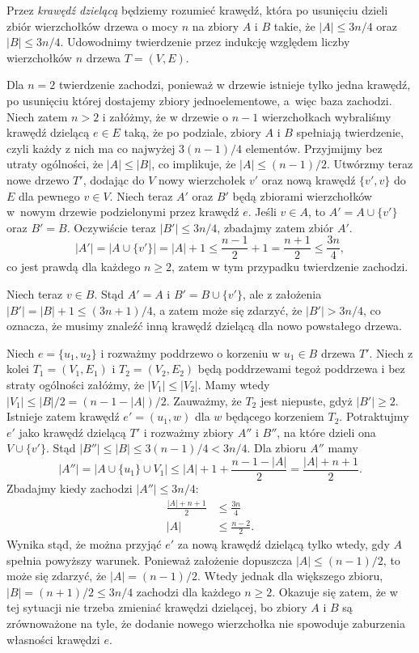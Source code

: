 
\subexercise{} %
Przez \emph{krawędź dzielącą} będziemy rozumieć krawędź, która po usunięciu dzieli zbiór wierzchołków drzewa o mocy $n$ na zbiory $A$ i $B$ takie, że $|A|\le3n/4$ oraz $|B|\le3n/4$. Udowodnimy twierdzenie przez indukcję względem liczby wierzchołków $n$ drzewa $T=(V,E)$.

Dla $n=2$ twierdzenie zachodzi, ponieważ w drzewie istnieje tylko jedna krawędź, po usunięciu której dostajemy zbiory jednoelementowe, a~więc baza zachodzi. Niech zatem $n>2$ i załóżmy, że w drzewie o $n-1$ wierzchołkach wybraliśmy krawędź dzielącą $e\in E$ taką, że po podziale, zbiory $A$ i $B$ spełniają twierdzenie, czyli każdy z nich ma co najwyżej $3(n-1)/4$ elementów. Przyjmijmy bez utraty ogólności, że $|A|\le|B|$, co implikuje, że $|A|\le(n-1)/2$. Utwórzmy teraz nowe drzewo $T'$, dodając do $V$ nowy wierzchołek $v'$ oraz nową krawędź $\{v',v\}$ do $E$ dla pewnego $v\in V$. Niech teraz $A'$ oraz $B'$ będą zbiorami wierzchołków w~nowym drzewie podzielonymi przez krawędź $e$. Jeśli $v\in A$, to $A'=A\cup\{v'\}$ oraz $B'=B$. Oczywiście teraz $|B'|\le3n/4$, zbadajmy zatem zbiór $A'$.
\[
	|A'| = \bigl|A\cup\{v'\}\bigr| = |A|+1 \le \frac{n-1}{2}+1 = \frac{n+1}{2} \le \frac{3n}{4},
\]
co jest prawdą dla każdego $n\ge2$, zatem w tym przypadku twierdzenie zachodzi.

Niech teraz $v\in B$. Stąd $A'=A$ i $B'=B\cup \{v'\}$, ale z założenia $|B'|=|B|+1\le(3n+1)/4$, a zatem może się zdarzyć, że $|B'|>3n/4$, co oznacza, że musimy znaleźć inną krawędź dzielącą dla nowo powstałego drzewa.

Niech $e=\{u_1,u_2\}$ i rozważmy poddrzewo o korzeniu w $u_1\in B$ drzewa $T'$. Niech z kolei $T_1=(V_1,E_1)$ i $T_2=(V_2,E_2)$ będą poddrzewami tegoż poddrzewa i bez straty ogólności załóżmy, że $|V_1|\le|V_2|$. Mamy wtedy $|V_1|\le|B|/2=(n-1-|A|)/2$. Zauważmy, że $T_2$ jest niepuste, gdyż $|B'|\ge2$. Istnieje zatem krawędź $e'=(u_1,w)$ dla $w$ będącego korzeniem $T_2$. Potraktujmy $e'$ jako krawędź dzielącą $T'$ i rozważmy zbiory $A''$ i $B''$, na które dzieli ona $V\cup\{v'\}$. Stąd $|B''|\le|B|\le3(n-1)/4<3n/4$. Dla zbioru $A''$ mamy
\[
	|A''| = \bigl|A\cup\{u_1\}\cup V_1\bigr| \le |A|+1+\frac{n-1-|A|}{2} = \frac{|A|+n+1}{2}.
\]
Zbadajmy kiedy zachodzi $|A''|\le3n/4$:
\begin{align*}
	\frac{|A|+n+1}{2} &\le \frac{3n}{4} \\
	|A| &\le \frac{n-2}{2}.
\end{align*}
Wynika stąd, że można przyjąć $e'$ za nową krawędź dzielącą tylko wtedy, gdy $A$ spełnia powyższy warunek. Ponieważ założenie dopuszcza $|A|\le(n-1)/2$, to może się zdarzyć, że $|A|=(n-1)/2$. Wtedy jednak dla większego zbioru, $|B|=(n+1)/2\le3n/4$ zachodzi dla każdego $n\ge2$. Okazuje się zatem, że w tej sytuacji nie trzeba zmieniać krawędzi dzielącej, bo zbiory $A$ i $B$ są zrównoważone na tyle, że dodanie nowego wierzchołka nie spowoduje zaburzenia własności krawędzi $e$. 

